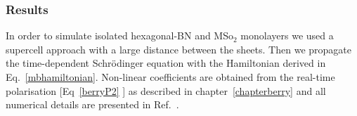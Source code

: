 




\subsubsection{Results}
In order to simulate isolated hexagonal-BN and MSo$_2$ monolayers we used a supercell approach with a large distance between the sheets. Then we propagate the time-dependent Schr\"odinger equation with the Hamiltonian derived in Eq.~\ref{mbhamiltonian}. Non-linear coefficients are obtained from the real-time polarisation [Eq~\ref{berryP2} ] as described in chapter~\ref{chapterberry} and all numerical details are presented in Ref.~\cite{PhysRevB.89.081102}. 

